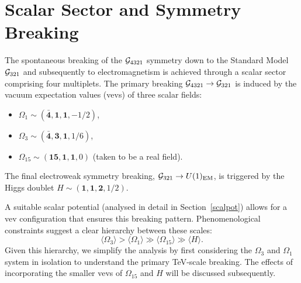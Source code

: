 \section{Scalar Sector and Symmetry Breaking}
The spontaneous breaking of the $\mathcal{G}_{\rm 4321}$ symmetry down to the Standard Model $\mathcal{G}_{\rm 321}$ and subsequently to electromagnetism is achieved through a scalar sector comprising four multiplets. The primary breaking $\mathcal{G}_{\rm 4321} \to \mathcal{G}_{\rm 321}$ is induced by the vacuum expectation values (vevs) of three scalar fields:
\begin{itemize}
    \item $\Omega_1 \sim \left( \mathbf{\bar 4}, \mathbf{1}, \mathbf{1}, -1/2 \right)$,
    \item $\Omega_3 \sim \left( \mathbf{\bar 4}, \mathbf{3}, \mathbf{1}, 1/6 \right)$,
    \item $\Omega_{15} \sim \left( \mathbf{15}, \mathbf{1}, \mathbf{1}, 0 \right)$ (taken to be a real field).
\end{itemize}
The final electroweak symmetry breaking, $\mathcal{G}_{\rm 321} \to U(1)_{\rm EM}$, is triggered by the Higgs doublet $H \sim (\mathbf{1},\mathbf{1},\mathbf{2},1/2)$.

A suitable scalar potential (analysed in detail in Section~\ref{scalpot}) allows for a vev configuration that ensures this breaking pattern. Phenomenological constraints suggest a clear hierarchy between these scales:
\begin{equation}
    \langle \Omega_{3} \rangle > \langle \Omega_{1} \rangle \gg \langle \Omega_{15} \rangle \gg \langle H \rangle.
\end{equation}
Given this hierarchy, we simplify the analysis by first considering the $\Omega_{3}$ and $\Omega_{1}$ system in isolation to understand the primary TeV-scale breaking. The effects of incorporating the smaller vevs of $\Omega_{15}$ and $H$ will be discussed subsequently.

